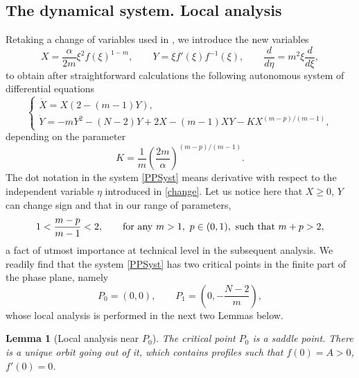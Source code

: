 \documentclass[a4paper,11pt]{article}
\newtheorem{lemma}[theorem]{Lemma}
\numberwithin{equation}{section}
\begin{document}
\subsection{The dynamical system. Local analysis}\label{subsec.finite}

Retaking a change of variables used in \cite{ISV08}, we introduce the new variables
\begin{equation}\label{change}
X=\frac{\alpha}{2m}\xi^2f(\xi)^{1-m}, \qquad Y=\xi f'(\xi)f^{-1}(\xi), \qquad \frac{d}{d\eta}=m^2\xi\frac{d}{d\xi},
\end{equation}
to obtain after straightforward calculations the following autonomous system of differential equations
\begin{equation}\label{PPSyst}
\left\{\begin{array}{ll}\dot{X}=X(2-(m-1)Y),\\ \dot{Y}=-mY^2-(N-2)Y+2X-(m-1)XY-KX^{(m-p)/(m-1)},\end{array}\right.
\end{equation}
depending on the parameter
\begin{equation}\label{param}
K=\frac{1}{m}\left(\frac{2m}{\alpha}\right)^{(m-p)/(m-1)}.
\end{equation}
The dot notation in the system \eqref{PPSyst} means derivative with respect to the independent variable $\eta$ introduced in \eqref{change}. Let us notice here that $X\geq0$, $Y$ can change sign and that in our range of parameters,
$$
1<\frac{m-p}{m-1}<2, \qquad {\rm for \ any} \ m>1, \ p\in(0,1), \ {\rm such \ that} \ m+p>2,
$$
a fact of utmost importance at technical level in the subsequent analysis. We readily find that the system \eqref{PPSyst} has two critical points in the finite part of the phase plane, namely
$$
P_0=(0,0), \qquad P_1=\left(0,-\frac{N-2}{m}\right),
$$
whose local analysis is performed in the next two Lemmas below.
\begin{lemma}[Local analysis near $P_0$]\label{lem.P0}
The critical point $P_0$ is a saddle point. There is a unique orbit going out of it, which contains profiles such that $f(0)=A>0$, $f'(0)=0$.
\end{lemma}
\end{document}
